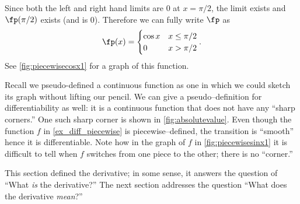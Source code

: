 {%
Since both the left and right hand limits are 0 at $x=\pi/2$, the limit exists and $\fp(\pi/2)$ exists (and is 0). Therefore we can fully write $\fp$ as $$\fp(x) = \begin{cases}\cos x & x\leq\pi/2\\ 0 & x>\pi/2\end{cases}.$$ See \autoref{fig:piecewisecosx1} for a graph of this function.}

Recall we pseudo-defined a continuous function as one in which we could sketch its graph without lifting our pencil. We can give a pseudo--definition for differentiability as well: it is a continuous function that does not have any ``sharp corners.'' One such sharp corner is shown in \autoref{fig:absolutevalue}. Even though the function $f$ in \autoref{ex_diff_piecewise} is piecewise--defined, the transition is ``smooth'' hence it is differentiable. Note how in the graph of $f$ in \autoref{fig:piecewisesinx1} it is difficult to tell when $f$ switches from one piece to the other; there is no ``corner.''


This section defined the derivative; in some sense, it answers the question of ``What \textit{is} the derivative?'' The next section addresses the question ``What does the derivative \textit{mean}?''



